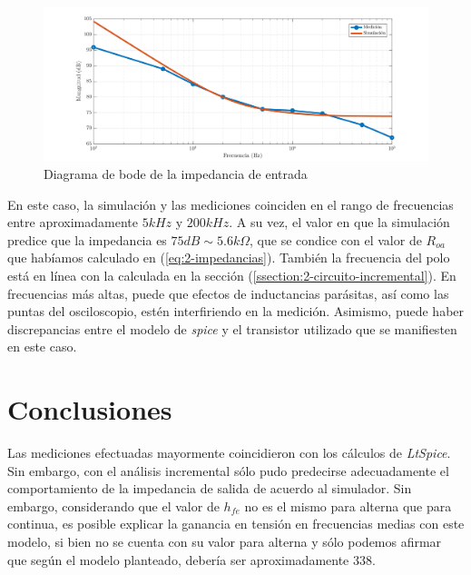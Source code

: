 \documentclass[../../e1_tp1_main.tex]{subfiles}
\begin{document}
\begin{figure} [H]
	\centering
	\includegraphics[scale=0.65]{imagenes/e1_tp1_ej2_zout_mag.png}	
	\caption{Diagrama de bode de la impedancia de entrada}
\end{figure}

En este caso, la simulaci\'on y las mediciones coinciden en el rango de frecuencias entre aproximadamente $5kHz$ y $200kHz$. A su vez, el valor en que la simulaci\'on predice que la impedancia es $75dB \sim 5.6k\Omega$, que se condice con el valor de $R_{oa}$ que hab\'iamos calculado en  (\ref{eq:2-impedancias}). Tambi\'en la frecuencia del polo est\'a en l\'inea con la calculada en la secci\'on (\ref{ssection:2-circuito-incremental}). En frecuencias m\'as altas, puede que efectos de inductancias par\'asitas, as\'i como las puntas del osciloscopio, est\'en interfiriendo en la medici\'on. Asimismo, puede haber discrepancias entre el modelo de \textit{spice} y el transistor utilizado que se manifiesten en este caso.



\section{Conclusiones}

Las mediciones efectuadas mayormente coincidieron con los c\'alculos de \textit{LtSpice}. Sin embargo, con el an\'alisis incremental s\'olo pudo predecirse adecuadamente el comportamiento de la impedancia de salida de acuerdo al simulador. Sin embargo, considerando que el valor de $h_{fe}$ no es el mismo para alterna que para continua, es posible explicar la ganancia en tensi\'on en frecuencias medias con este modelo, si bien no se cuenta con su valor para alterna y s\'olo podemos afirmar que seg\'un el modelo planteado, deber\'ia ser aproximadamente $338$. 
\end{document}
